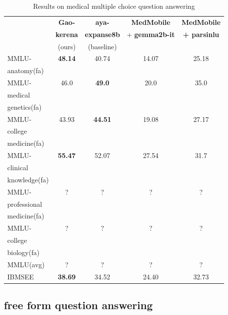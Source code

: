 \documentclass[conference]{IEEEtran}
\begin{document}
\begin{table}[ht]
	\centering
	\caption{Results on medical multiple choice question answering}
	\begin{tabular}{|l|c|c|c|c|}  %
		\hline
		\textbf{} & \textbf{Gao-} & \textbf{aya-}
		 & \textbf{MedMobile} & \textbf{MedMobile} \\ 
		 & \textbf{kerena} & \textbf{expanse8b} & + \textbf{gemma2b-it} & \textbf{+ parsinlu} \\
		 & (ours) & (baseline) &  &  \\ \hline
		MMLU- & \textbf{48.14} & 40.74 & 14.07 & 25.18 \\ 
		anatomy(fa) &  &  &  &  \\ \hline
		MMLU- & 46.0 & \textbf{49.0} & 20.0 & 35.0 \\
		medical &  &  &  &  \\ 
		genetics(fa) &  &  &  &  \\ \hline
		MMLU- & 43.93 & \textbf{44.51} & 19.08 & 27.17 \\
		college &  &  &  &  \\
		medicine(fa) &  &  &  &  \\ \hline
		MMLU- & \textbf{55.47} & 52.07 & 27.54 & 31.7 \\
		clinical&  &  &  &  \\
		knowledge(fa)&  &  &  &  \\ \hline
		MMLU- & ? & ? & ? & ? \\
        professional&  &  &  &  \\ 
        medicine(fa)&  &  &  &  \\ \hline
        MMLU- & ? & ? & ? & ? \\
        college&  &  &  &  \\
        biology(fa)&  &  &  &  \\ \hline
        MMLU(avg) & ? & ? & ? & ? \\ \hline
		IBMSEE & \textbf{38.69} & 34.52 & 24.40 & 32.73 \\ 
        \hline
	\end{tabular}
	\label{tab:model_results_on_mcqa}
\end{table}
\subsection{free form question answering}
\end{document}
